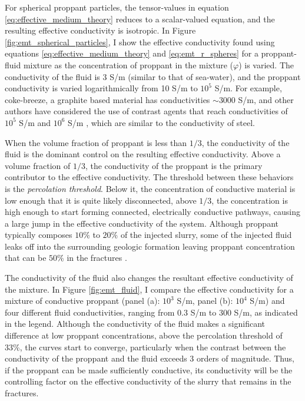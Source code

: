 For spherical proppant particles, the tensor-values in equation \ref{eq:effective_medium_theory} reduces to a scalar-valued equation, and the resulting effective conductivity is isotropic. In Figure \ref{fig:emt_spherical_particles}, I show the effective conductivity found using equations \ref{eq:effective_medium_theory} and \ref{eq:emt_r_spheres} for a proppant-fluid mixture as the concentration of proppant in the mixture ($\varphi$) is varied. The conductivity of the fluid is 3 S/m (similar to that of sea-water), and the proppant conductivity is varied logarithmically from 10 S/m to $10^5$ S/m. For example, coke-breeze, a graphite based material has conductivities $\sim 3000$ S/m, and other authors have considered the use of contrast agents that reach conductivities of $10^5$ S/m \cite{Weiss2015} and $10^6$ S/m \cite{Pardo2013}, which are similar to the conductivity of steel.




When the volume fraction of proppant is less than $1/3$, the conductivity of the fluid is the dominant control on the resulting effective conductivity. Above a volume  fraction of $1/3$, the conductivity of the proppant is the primary contributor to the effective conductivity. The threshold between these behaviors is the \emph{percolation threshold}. Below it, the concentration of conductive material is low enough that it is quite likely disconnected, above $1/3$, the concentration is high enough to start forming connected, electrically conductive pathways, causing a large jump in the effective conductivity of the system. Although proppant typically composes $10\%$ to $20\%$ of the injected slurry, some of the injected fluid leaks off into the surrounding geologic formation leaving proppant concentration that can be $50\%$ in the fractures \cite{Novotny1977, Hoversten2015}.

The conductivity of the fluid also changes the resultant effective conductivity of the mixture. In Figure \ref{fig:emt_fluid}, I compare the effective conductivity for a mixture of conductive proppant (panel (a): $10^3$ S/m, panel (b): $10^4$ S/m) and four different fluid conductivities, ranging from 0.3 S/m to 300 S/m, as indicated in the legend. Although the conductivity of the fluid makes a significant difference at low proppant concentrations, above the percolation threshold of 33\%, the curves start to converge, particularly when the contrast between the conductivity of the proppant and the fluid exceeds 3 orders of magnitude. Thus, if the proppant can be made sufficiently conductive, its conductivity will be the controlling factor on the effective conductivity of the slurry that remains in the fractures.


